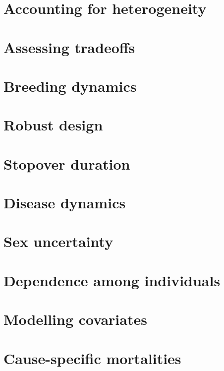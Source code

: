 \documentclass[
  12pt,
]{krantz}
\begin{document}
\hypertarget{heterogeneity}{%
\chapter{Accounting for heterogeneity}\label{heterogeneity}}

\hypertarget{tradeoffs}{%
\chapter{Assessing tradeoffs}\label{tradeoffs}}

\hypertarget{breeding}{%
\chapter{Breeding dynamics}\label{breeding}}

\hypertarget{rd}{%
\chapter{Robust design}\label{rd}}

\hypertarget{stopover}{%
\chapter{Stopover duration}\label{stopover}}

\hypertarget{disease}{%
\chapter{Disease dynamics}\label{disease}}

\hypertarget{sex}{%
\chapter{Sex uncertainty}\label{sex}}

\hypertarget{dependence}{%
\chapter{Dependence among individuals}\label{dependence}}

\hypertarget{covariateselection}{%
\chapter{Modelling covariates}\label{covariateselection}}

\hypertarget{mortalities}{%
\chapter{Cause-specific mortalities}\label{mortalities}}
\end{document}
